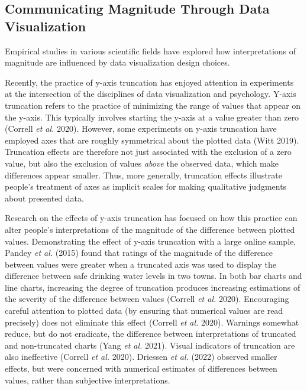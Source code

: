 \documentclass[
]{interact}
\begin{document}
\hypertarget{communicating-magnitude-through-data-visualization}{%
\subsection{Communicating Magnitude Through Data
Visualization}\label{communicating-magnitude-through-data-visualization}}

Empirical studies in various scientific fields have explored how
interpretations of magnitude are influenced by data visualization design
choices.

Recently, the practice of y-axis truncation has enjoyed attention in
experiments at the intersection of the disciplines of data visualization
and psychology. Y-axis truncation refers to the practice of minimizing
the range of values that appear on the y-axis. This typically involves
starting the y-axis at a value greater than zero (Correll \emph{et al.}
2020). However, some experiments on y-axis truncation have employed axes
that are roughly symmetrical about the plotted data (Witt 2019).
Truncation effects are therefore not just associated with the exclusion
of a zero value, but also the exclusion of values \emph{above} the
observed data, which make differences appear smaller. Thus, more
generally, truncation effects illustrate people's treatment of axes as
implicit scales for making qualitative judgments about presented data.

Research on the effects of y-axis truncation has focused on how this
practice can alter people's interpretations of the magnitude of the
difference between plotted values. Demonstrating the effect of y-axis
truncation with a large online sample, Pandey \emph{et al.} (2015) found
that ratings of the magnitude of the difference between values were
greater when a truncated axis was used to display the difference between
safe drinking water levels in two towns. In both bar charts and line
charts, increasing the degree of truncation produces increasing
estimations of the severity of the difference between values (Correll
\emph{et al.} 2020). Encouraging careful attention to plotted data (by
ensuring that numerical values are read precisely) does not eliminate
this effect (Correll \emph{et al.} 2020). Warnings somewhat reduce, but
do not eradicate, the difference between interpretations of truncated
and non-truncated charts (Yang \emph{et al.} 2021). Visual indicators of
truncation are also ineffective (Correll \emph{et al.} 2020). Driessen
\emph{et al.} (2022) observed smaller effects, but were concerned with
numerical estimates of differences between values, rather than
subjective interpretations.
\end{document}

